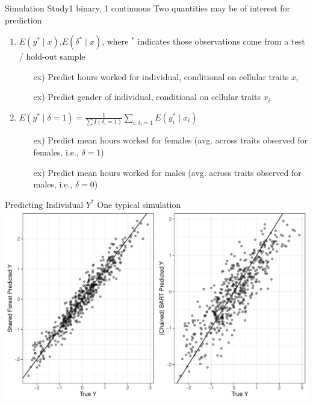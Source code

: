 \documentclass{beamer}
\begin{document}
\begin{frame}{Simulation Study}{1 binary, 1 continuous }
Two quantities may be of interest for prediction
\begin{enumerate}
\item $E( y^* \mid x)$,$E(\delta^* \mid x)$, where $^*$ indicates those observations come from a test / hold-out sample
  \begin{itemize}
    \item[ex)] Predict hours worked for individual, conditional on cellular traits $x_i$
    \item[ex)] Predict gender of individual, conditional on cellular traits $x_i$
  \end{itemize}
\item $E(y^* \mid \delta = 1) = \frac{1}{\sum I(\delta_i = 1)}\sum_{i: \delta_i = 1}E(y_i^* \mid x_i)$
  \begin{itemize}
    \item[ex)] Predict mean hours worked for females (avg. across traits observed for females, i.e., $\delta = 1$)
    \item[ex)] Predict mean hours worked for males (avg. across traits observed for males, i.e., $\delta = 0$)
  \end{itemize}
\end{enumerate}
\end{frame}


\begin{frame}{Predicting Individual $Y^*$ }{One typical simulation}
\includegraphics[width = .9\linewidth]{continuous_sim_results_single_sim.pdf}
\end{frame}
\end{document}
